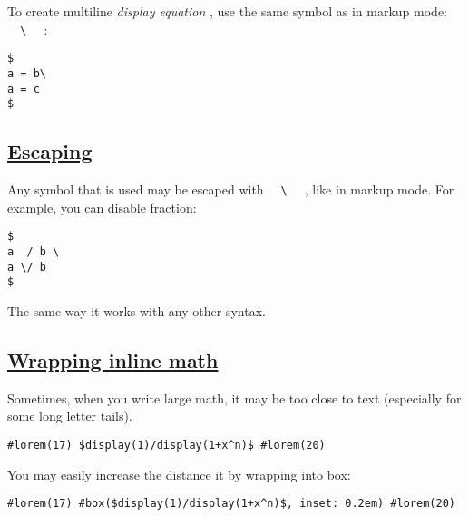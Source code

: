 To create multiline \emph{display equation} , use the same symbol as in
markup mode: \texttt{\ }{\texttt{\ \textbackslash{}\ }}\texttt{\ } :

\begin{verbatim}
$
a = b\
a = c
$
\end{verbatim}

\pandocbounded{}

\subsection{\texorpdfstring{\hyperref[escaping]{Escaping}}{Escaping}}\label{escaping}

Any symbol that is used may be escaped with
\texttt{\ }{\texttt{\ \textbackslash{}\ }}\texttt{\ } , like in markup
mode. For example, you can disable fraction:

\begin{verbatim}
$
a  / b \
a \/ b
$
\end{verbatim}

\pandocbounded{}

The same way it works with any other syntax.

\subsection{\texorpdfstring{\hyperref[wrapping-inline-math]{Wrapping
inline math}}{Wrapping inline math}}\label{wrapping-inline-math}

Sometimes, when you write large math, it may be too close to text
(especially for some long letter tails).

\begin{verbatim}
#lorem(17) $display(1)/display(1+x^n)$ #lorem(20)
\end{verbatim}

\pandocbounded{}

You may easily increase the distance it by wrapping into box:

\begin{verbatim}
#lorem(17) #box($display(1)/display(1+x^n)$, inset: 0.2em) #lorem(20)
\end{verbatim}


